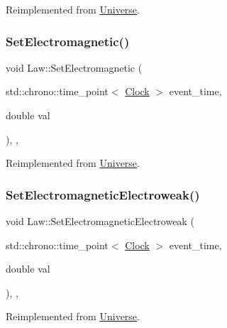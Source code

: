 Reimplemented from \mbox{\hyperlink{classUniverse_aa22202ae740eb1355529afcb13285e91}{Universe}}.

\mbox{\label{classLaw_acabe1a3113c207368f3bb6fe81e13963}} 
\subsubsection{\texorpdfstring{Set\+Electromagnetic()}{SetElectromagnetic()}}
{\footnotesize\ttfamily void Law\+::\+Set\+Electromagnetic (\begin{DoxyParamCaption}\item[{std\+::chrono\+::time\+\_\+point$<$ \mbox{\hyperlink{universe_8h_a0ef8d951d1ca5ab3cfaf7ab4c7a6fd80}{Clock}} $>$}]{event\+\_\+time,  }\item[{double}]{val }\end{DoxyParamCaption})\hspace{0.3cm}{\ttfamily [inline]}, {\ttfamily [final]}, {\ttfamily [virtual]}}



Reimplemented from \mbox{\hyperlink{classUniverse_aa981fc7e252b1fbbb675f0371860954d}{Universe}}.

\mbox{\label{classLaw_aca9bb82839ddb46bd89f52b6211c5a54}} 
\subsubsection{\texorpdfstring{Set\+Electromagnetic\+Electroweak()}{SetElectromagneticElectroweak()}}
{\footnotesize\ttfamily void Law\+::\+Set\+Electromagnetic\+Electroweak (\begin{DoxyParamCaption}\item[{std\+::chrono\+::time\+\_\+point$<$ \mbox{\hyperlink{universe_8h_a0ef8d951d1ca5ab3cfaf7ab4c7a6fd80}{Clock}} $>$}]{event\+\_\+time,  }\item[{double}]{val }\end{DoxyParamCaption})\hspace{0.3cm}{\ttfamily [inline]}, {\ttfamily [final]}, {\ttfamily [virtual]}}



Reimplemented from \mbox{\hyperlink{classUniverse_a608aa95698380f791a0ffba45cc1bee3}{Universe}}.


